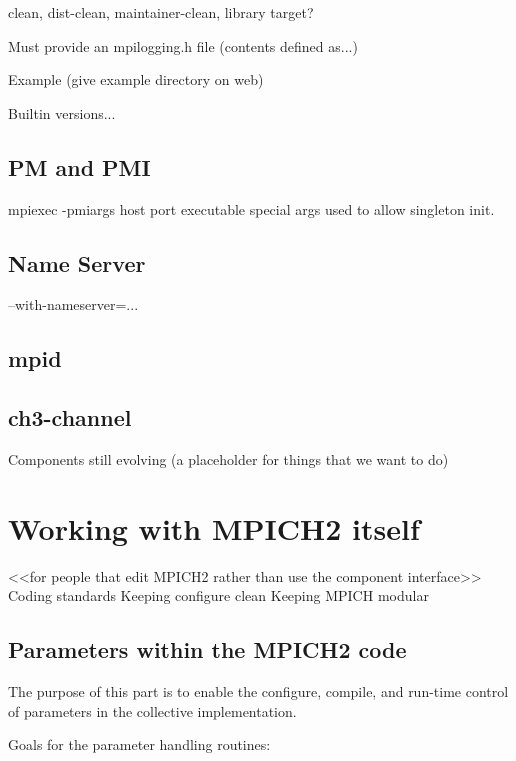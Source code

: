 \documentclass{report}
\begin{document}
    clean, dist-clean, maintainer-clean, library target?

    Must provide an mpilogging.h file (contents defined as...)

    Example (give example directory on web)

    Builtin versions...

\section{PM and PMI}

mpiexec 
    -pmiargs host port executable
special args used to allow singleton init.

\section{Name Server}

    --with-nameserver=...

\section{mpid}
\section{ch3-channel}

          Components still evolving (a placeholder for things that we want to do)

\chapter{Working with MPICH2 itself}
          <<for people that edit MPICH2 rather than use the component interface>>
          Coding standards
          Keeping configure clean
          Keeping MPICH modular
          

\section{Parameters within the MPICH2 code}

   The purpose of this part is to enable the configure, compile, and
   run-time control of parameters in the collective implementation.

   Goals for the parameter handling routines:
\end{document}
